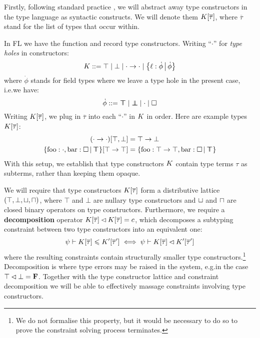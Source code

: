 Firstly, following standard practice \cite{essence-of-ml-type-inference, constraint-based-freeze-ml},  we will abstract away type constructors in the type language as syntactic constructs. We will denote them $K[\overline \tau]$, where $\overline \tau$ stand for the list of types that occur within.
\begin{example}
    In FL we have the function and record type constructors. Writing \enquote{$\cdot$} for \emph{type holes} in constructors:
    $$ \constr ::= \top \mid \bot \mid {\cdot} \to {\cdot} \mid \flext{\ell : \dot \phi}{\dot \phi} $$
    where $\dot \phi$ stands for field types where we leave a type hole in the present case, i.e.\@ we have:
    $$ \dot \phi ::= \flftop \mid \flfbot \mid \cdot \mid \flabsent $$
    Writing $K[\overline \tau]$, we plug in $\overline \tau$ into each \enquote{$\cdot$} in $K$ in order. Here are example types $K[\overline \tau]$:
    \begin{align*}  
        (\cdot \to \cdot)[\top, \bot] &= \top \to \bot \\
        \flext{\mathrm{foo}: \cdot, \mathrm{bar} : \flabsent}{\flftop}[\top \to \top] &= \flext{\mathrm{foo}: \top \to \top, \mathrm{bar} : \flabsent}{\flftop}
    \end{align*}
    With this setup, we establish that type constructors $K$ contain type terms $\tau$ as subterms, rather than keeping them opaque. 
\end{example}
We will require that type constructors $K[\overline \tau]$ form a distributive lattice $(\top, \bot, \sqcup, \sqcap)$, where $\top$ and $\bot$ are nullary type constructors and $\sqcup$ and $\sqcap$ are closed binary operators on type constructors. Furthermore, we require a \textbf{decomposition} operator $K[\overline \tau] \lhd K[\overline \tau] = c$, which decomposes a subtyping constraint between two type constructors into an equivalent one:
$$ \psi \vdash K[\overline \tau] \leqslant K'[\overline \tau'] \iff \psi \vdash K[\overline \tau] \lhd K'[\overline \tau'] $$
where the resulting constraints contain structurally smaller type constructors.\footnote{We do not formalise this property, but it would be necessary to do so to prove the constraint solving process terminates.} Decomposition is where type errors may be raised in the system, e.g.\@ in the case $\top \lhd \bot = \mathbf F$. Together with the type constructor lattice and constraint decomposition we will be able to effectively massage constraints involving type constructors. 
